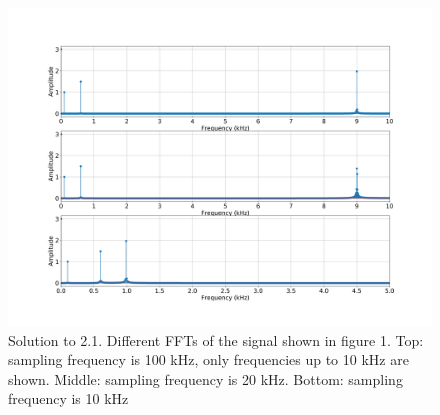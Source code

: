 \documentclass{scrartcl}			%
\begin{document}
\begin{figure}[hbpt!]					%
	\centering
	\includegraphics[scale=0.3]{2.png}
	\captionsetup{width=\linewidth}  %
	\caption{Solution to 2.1. Different FFTs of the signal shown in figure 1. Top: sampling frequency is
		100 kHz, only frequencies up to 10 kHz are shown. Middle: sampling frequency is	20 kHz. Bottom: sampling frequency is 10 kHz}
	\label{fig:figure} %
\end{figure}
\end{document}
